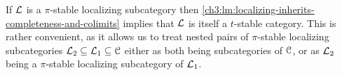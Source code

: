 \begin{remark}
    \label{ch3:rm:pi-stable-implies-t-stable}
    If $\mathcal{L}$ is a $\pi$-stable localizing subcategory then \cref{ch3:lm:localizing-inherits-completeness-and-colimits} implies that $\mathcal{L}$ is itself a $t$-stable category. This is rather convenient, as it allows us to treat nested pairs of $\pi$-stable localizing subcategories $\mathcal{L}_2 \subseteq \mathcal{L}_1 \subseteq \EuScript{C}$ either as both being subcategories of $\EuScript{C}$, or as $\mathcal{L}_2$ being a $\pi$-stable localizing subcategory of $\mathcal{L}_1$. 
\end{remark}





